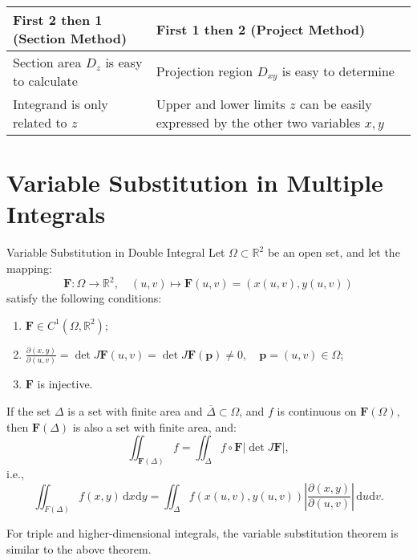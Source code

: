 \documentclass[11pt]{../../TexTemplate/elegantbook}
\begin{document}
\begin{tabular}{p{} p{}}
    \textbf{First 2 then 1 (Section Method)} & \textbf{First 1 then 2 (Project Method)} \\
    \toprule
    Section area \(D_{z}\) is easy to calculate & Projection region \(D_{xy}\) is easy to determine \\
    \hline
    Integrand is only related to \(z\) & Upper and lower limits \(z\) can be easily expressed by the other two variables \(x,y\) \\
    \bottomrule
\end{tabular}



\section{Variable Substitution in Multiple Integrals}
\begin{theorem}{Variable Substitution in Double Integral}
    Let \( \Omega \subset \mathbb{R}^2 \) be an open set, and let the mapping:
    \[
    \mathbf{F}: \Omega \to \mathbb{R}^2, \quad (u, v) \mapsto \mathbf{F}(u, v) = (x(u, v), y(u, v))
    \]
    satisfy the following conditions:
    \begin{enumerate}
        \item \( \mathbf{F} \in C^1(\Omega, \mathbb{R}^2) \);
        \item \( \frac{\partial (x, y)}{\partial (u, v)} 
            = \det J\mathbf{F}(u, v) = \det J\mathbf{F}(\mathbf{p}) \neq 0, \quad \mathbf{p} = (u, v) \in \Omega \);
        \item \( \mathbf{F} \) is injective.
    \end{enumerate}

    If the set \( \Delta \) is a set with finite area and 
    \( \overline{\Delta} \subset \Omega \), and \( f \) is continuous on \( \mathbf{F}(\Omega) \), 
    then \( \mathbf{F}(\Delta) \) is also a set with finite area, and:
    \[
    \iint_{\mathbf{F}(\Delta)} f = \iint_{\Delta} f \circ \mathbf{F} \left| \det J\mathbf{F} \right|,
    \]
    i.e.,
    \[
    \iint_{F(\Delta)} f(x, y) \, \mathrm{d}x \mathrm{d}y = 
    \iint_{\Delta} f(x(u, v), y(u, v)) \left| \frac{\partial (x, y)}{\partial (u, v)} \right| \, \mathrm{d}u \mathrm{d}v.
    \]
\end{theorem}

For triple and higher-dimensional integrals, the variable substitution theorem is similar to the above theorem.
\end{document}
